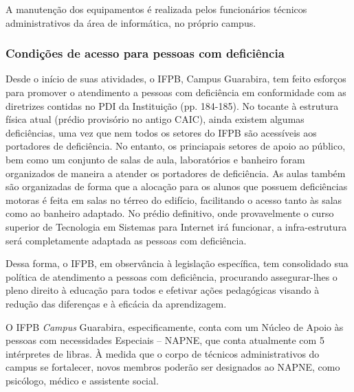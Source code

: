 A manutenção dos equipamentos é realizada pelos funcionários técnicos administrativos da área de informática, no próprio campus.

\subsubsection{Condições de acesso para pessoas com deficiência}

	Desde o início de suas atividades, o IFPB, Campus Guarabira, tem feito esforços para promover o atendimento a pessoas com deficiência em conformidade com as diretrizes contidas no PDI da Instituição (pp. 184-185). No tocante à estrutura física atual (pr\'edio provis\'orio no antigo CAIC), ainda existem algumas defici\^encias, uma vez que nem todos os setores do IFPB são acessíveis aos portadores de defici\^encia. No entanto, os princiapais setores de apoio ao p\'ublico, bem como um conjunto de salas de aula, laborat\'orios e banheiro foram organizados de maneira a atender os portadores de defici\^encia. As aulas também são organizadas de forma que a alocação para os alunos que possuem deficiências motoras é feita em salas no térreo do edifício, facilitando o acesso tanto às salas como ao banheiro adaptado. No pr\'edio definitivo, onde provavelmente o curso superior de Tecnologia em Sistemas para Internet ir\'a funcionar, a infra-estrutura ser\'a completamente adaptada as pessoas com deficiência.

	Dessa forma, o IFPB, em observância à legislação específica, tem consolidado sua política de atendimento a pessoas com deficiência, procurando assegurar-lhes o pleno direito à educação para todos e efetivar ações pedagógicas visando à redução das diferenças e à eficácia da aprendizagem.
 
	O IFPB \textit{Campus} Guarabira, especificamente, conta com um Núcleo de Apoio às pessoas com necessidades Especiais – NAPNE, que conta atualmente com 5 intérpretes de libras. \`A medida que o corpo de t\'ecnicos administrativos do campus se fortalecer, novos membros poder\~ao ser designados ao NAPNE, como psic\'ologo, m\'edico e assistente social.



